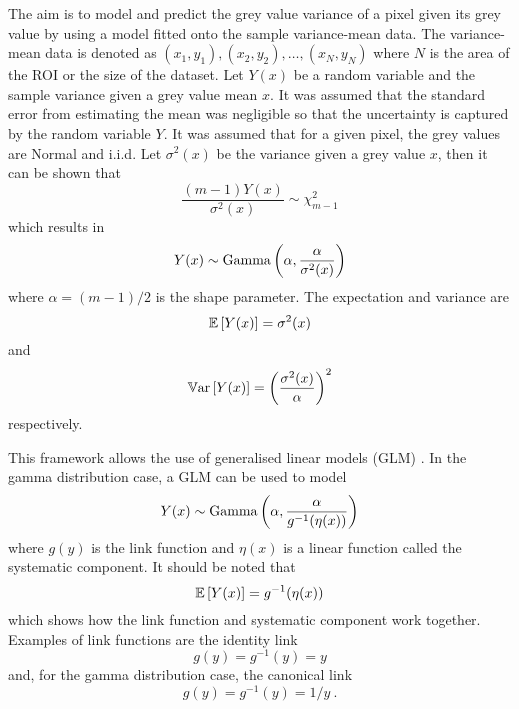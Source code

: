 The aim is to model and predict the grey value variance of a pixel given its grey value by using a model fitted onto the sample variance-mean data. The variance-mean data is denoted as $(x_1,y_1),(x_2,y_2),\ldots,(x_N,y_N)$ where $N$ is the area of the ROI or the size of the dataset. Let $Y(x)$ be a random variable and the sample variance given a grey value mean $x$. It was assumed that the standard error from estimating the mean was negligible so that the uncertainty is captured by the random variable $Y$. It was assumed that for a given pixel, the grey values are Normal and i.i.d. Let $\sigma^2(x)$ be the variance given a grey value $x$, then it can be shown that
\begin{equation}
\dfrac{(m-1)Y(x)}{\sigma^2(x)}\sim\chi^2_{m-1}
\end{equation}
which results in
\begin{equation}
Y(x)\sim\operatorname{Gamma}\left(\alpha,\dfrac{\alpha}{\sigma^2(x)}\right)
\end{equation}
where $\alpha=(m-1)/2$ is the shape parameter. The expectation and variance are
\begin{equation}
\operatorname{\mathbb{E}}\left[Y(x)\right]=\sigma^2(x)
\end{equation}
and
\begin{equation}
\operatorname{\mathbb{V}ar}\left[Y(x)\right]=\left(\dfrac{\sigma^2(x)}{\alpha}\right)^2
\end{equation}
respectively.

This framework allows the use of generalised linear models (GLM) \citep{nelder1972generalized,nelder1972generalized_2, mccullagh1984generalized}. In the gamma distribution case, a GLM can be used to model
\begin{equation}
Y(x)\sim\operatorname{Gamma}\left(\alpha,\dfrac{\alpha}{g^{-1}(\eta(x))}\right)
\end{equation}
where $g(y)$ is the link function and $\eta(x)$ is a linear function called the systematic component. It should be noted that
\begin{equation}
  \operatorname{\mathbb{E}}\left[Y(x)\right]=g^{-1}(\eta(x))
\end{equation}
which shows how the link function and systematic component work together. Examples of link functions are the identity link
\begin{equation}
g(y)=g^{-1}(y)=y
\end{equation}
and, for the gamma distribution case, the canonical link
\begin{equation}
g(y)=g^{-1}(y)=1/y \ .
\end{equation}


